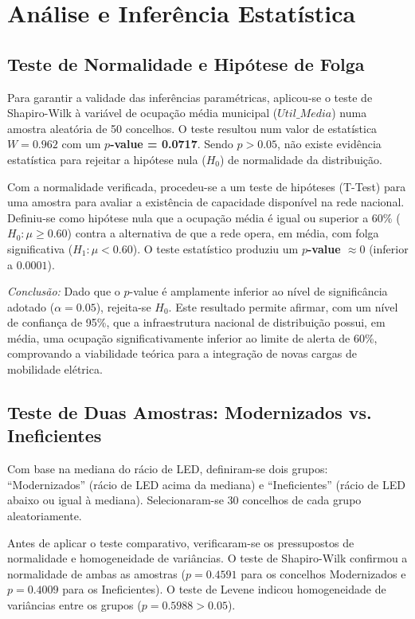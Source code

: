 \documentclass[conference]{IEEEtran}
\begin{document}
\section{Análise e Inferência Estatística}
\subsection{Teste de Normalidade e Hipótese de Folga}

Para garantir a validade das inferências paramétricas, aplicou-se o teste de Shapiro-Wilk à variável de ocupação média municipal ($Util\_Media$) numa amostra aleatória de 50 concelhos. O teste resultou num valor de estatística $W = 0.962$ com um \textbf{$p$-value = 0.0717}. Sendo $p > 0.05$, não existe evidência estatística para rejeitar a hipótese nula ($H_0$) de normalidade da distribuição.

Com a normalidade verificada, procedeu-se a um teste de hipóteses (T-Test) para uma amostra para avaliar a existência de capacidade disponível na rede nacional. Definiu-se como hipótese nula que a ocupação média é igual ou superior a 60\% ($H_0: \mu \ge 0.60$) contra a alternativa de que a rede opera, em média, com folga significativa ($H_1: \mu < 0.60$). O teste estatístico produziu um \textbf{$p$-value $\approx 0$} (inferior a $0.0001$).

\textit{Conclusão:} Dado que o $p$-value é amplamente inferior ao nível de significância adotado ($\alpha = 0.05$), rejeita-se $H_0$. Este resultado permite afirmar, com um nível de confiança de 95\%, que a infraestrutura nacional de distribuição possui, em média, uma ocupação significativamente inferior ao limite de alerta de 60\%, comprovando a viabilidade teórica para a integração de novas cargas de mobilidade elétrica.

\subsection{Teste de Duas Amostras: Modernizados vs. Ineficientes}

Com base na mediana do rácio de LED, definiram-se dois grupos: ``Modernizados'' (rácio de LED acima da mediana) e ``Ineficientes'' (rácio de LED abaixo ou igual à mediana). Selecionaram-se 30 concelhos de cada grupo aleatoriamente.

Antes de aplicar o teste comparativo, verificaram-se os pressupostos de normalidade e homogeneidade de variâncias. O teste de Shapiro-Wilk confirmou a normalidade de ambas as amostras ($p = 0.4591$ para os concelhos Modernizados e $p = 0.4009$ para os Ineficientes). O teste de Levene indicou homogeneidade de variâncias entre os grupos ($p = 0.5988 > 0.05$).
\end{document}
